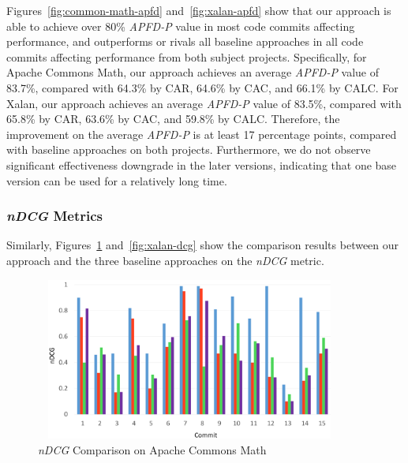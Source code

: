 Figures~\ref{fig:common-math-apfd} and~\ref{fig:xalan-apfd} show that our approach is able to achieve over 80\% \textit{APFD-P} value in most code commits affecting performance, and outperforms or rivals all baseline approaches in all code commits affecting performance from both subject projects. Specifically, for Apache Commons Math, our approach achieves an average \textit{APFD-P} value of 83.7\%, compared with 64.3\% by CAR, 64.6\% by CAC, and 66.1\% by CALC. For Xalan, our approach achieves an average \textit{APFD-P} value of 83.5\%, compared with 65.8\% by CAR, 63.6\% by CAC, and 59.8\% by CALC. Therefore, the improvement on the average \textit{APFD-P} is at least 17 percentage points, compared with baseline approaches on both projects. Furthermore, we do not observe significant effectiveness downgrade in the later versions, indicating that one base version can be used for a relatively long time.









\subsubsection{\textit{nDCG} Metrics}

Similarly, Figures~\ref{fig:common-math-dcg} and~\ref{fig:xalan-dcg} show the comparison results between our approach and the three baseline approaches on the \textit{nDCG} metric. 

\begin{figure}
\centering
		\includegraphics[width=4in, height=2.1in]{performance/images/common-math-dcg.pdf}
			
		\caption{\textit{nDCG} Comparison on Apache Commons Math}	
		\label{fig:common-math-dcg}
\end{figure}


